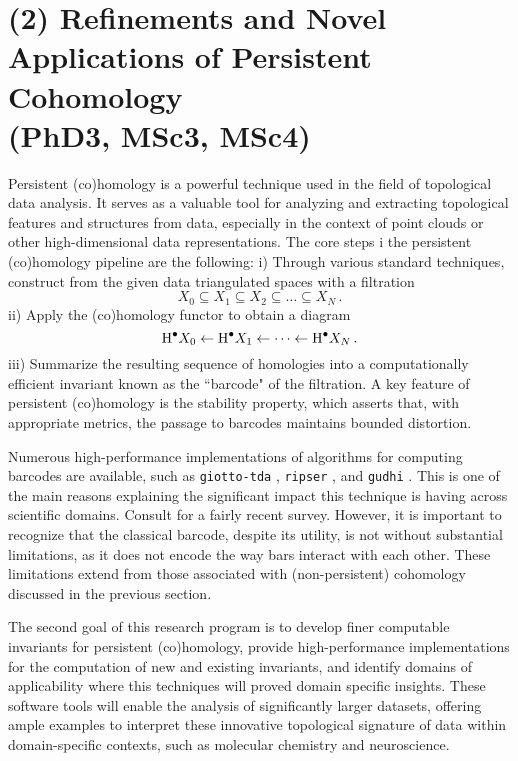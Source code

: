 
\section*{(2) Refinements and Novel Applications of Persistent Cohomology \\ (PhD3, MSc3, MSc4)}

Persistent (co)homology is a powerful technique used in the field of topological data analysis.
It serves as a valuable tool for analyzing and extracting topological features and structures from data, especially in the context of point clouds or other high-dimensional data representations.
The core steps i the persistent (co)homology pipeline are the following:
i) Through various standard techniques, construct from the given data triangulated spaces with a filtration
\[
X_0 \subseteq X_1 \subseteq X_2 \subseteq \dots \subseteq X_N \,.
\]
ii) Apply the (co)homology functor to obtain a diagram
\[
\mathrm{H}^\bullet X_0 \leftarrow \mathrm{H}^\bullet X_1 \leftarrow \dots \leftarrow \mathrm{H}^\bullet X_N \,.
\]
iii) Summarize the resulting sequence of homologies into a computationally efficient invariant known as the ``barcode" of the filtration.
A key feature of persistent (co)homology is the stability property, which asserts that, with appropriate metrics, the passage to barcodes maintains bounded distortion.

Numerous high-performance implementations of algorithms for computing barcodes are available, such as \texttt{giotto-tda} \cite{medina2021giotto}, \texttt{ripser} \cite{bauer2021ripser}, and \texttt{gudhi} \cite{gudhi}.
This is one of the main reasons explaining the significant impact this technique is having across scientific domains.
Consult \cite{carlsson2021topological} for a fairly recent survey.
However, it is important to recognize that the classical barcode, despite its utility, is not without substantial limitations, as it does not encode the way bars interact with each other.
These limitations extend from those associated with (non-persistent) cohomology discussed in the previous section.

The second goal of this research program is to develop finer computable invariants for persistent (co)homology, provide high-performance implementations for the computation of new and existing invariants, and identify domains of applicability where this techniques will proved domain specific insights.
These software tools will enable the analysis of significantly larger datasets, offering ample examples to interpret these innovative topological signature of data within domain-specific contexts, such as molecular chemistry and neuroscience.

